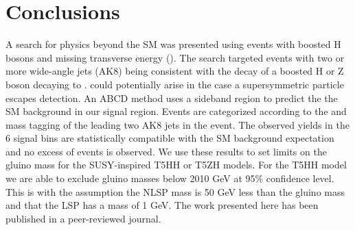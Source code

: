 \chapter{Conclusions}
\label{chap:conclusions}

A search for physics beyond the SM was presented using events with boosted H bosons and missing transverse energy (\ptmiss). The search targeted events with two or more wide-angle jets (AK8) being consistent with the decay of a boosted H or Z boson decaying to \bbbar. \ptmiss could potentially arise in the case a supersymmetric particle escapes detection. An ABCD method uses a sideband region to predict the the SM background in our signal region. Events are categorized according to the \bbbar and mass tagging of the leading two AK8 jets in the event. The observed yields in the 6 signal bins are statistically compatible with the SM background expectation and no excess of events is observed. We use these results to set limits on the gluino mass for the SUSY-inspired T5HH or T5ZH models. For the T5HH model we are able to exclude gluino masses below 2010 GeV at 95\% confidence level. This is with the assumption the NLSP mass is 50 GeV less than the gluino mass and that the LSP has a mass of 1 GeV. The work presented here has been published in a peer-reviewed journal\cite{CMS-SUS-17-006}.
